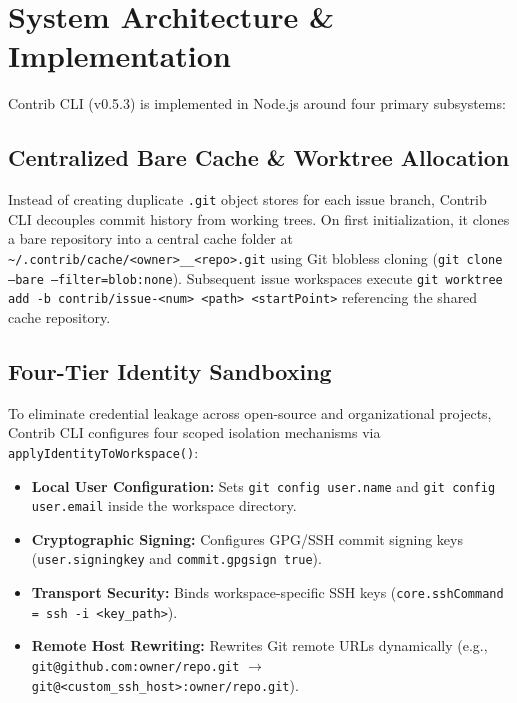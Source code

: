 \documentclass[10pt,conference]{IEEEtran}
\begin{document}
\section{System Architecture \& Implementation}
Contrib CLI (v0.5.3) is implemented in Node.js around four primary subsystems:

\subsection{Centralized Bare Cache \& Worktree Allocation}
Instead of creating duplicate \texttt{.git} object stores for each issue branch, Contrib CLI decouples commit history from working trees. On first initialization, it clones a bare repository into a central cache folder at \texttt{\textasciitilde/.contrib/cache/<owner>\_\_<repo>.git} using Git blobless cloning (\texttt{git clone --bare --filter=blob:none}). Subsequent issue workspaces execute \texttt{git worktree add -b contrib/issue-<num> <path> <startPoint>} referencing the shared cache repository.

\subsection{Four-Tier Identity Sandboxing}
To eliminate credential leakage across open-source and organizational projects, Contrib CLI configures four scoped isolation mechanisms via \texttt{applyIdentityToWorkspace()}:
\begin{itemize}
    \item \textbf{Local User Configuration:} Sets \texttt{git config user.name} and \texttt{git config user.email} inside the workspace directory.
    \item \textbf{Cryptographic Signing:} Configures GPG/SSH commit signing keys (\texttt{user.signingkey} and \texttt{commit.gpgsign true}).
    \item \textbf{Transport Security:} Binds workspace-specific SSH keys (\texttt{core.sshCommand = ssh -i <key\_path>}).
    \item \textbf{Remote Host Rewriting:} Rewrites Git remote URLs dynamically (e.g., \texttt{git@github.com:owner/repo.git} $\rightarrow$ \texttt{git@<custom\_ssh\_host>:owner/repo.git}).
\end{itemize}
\end{document}
